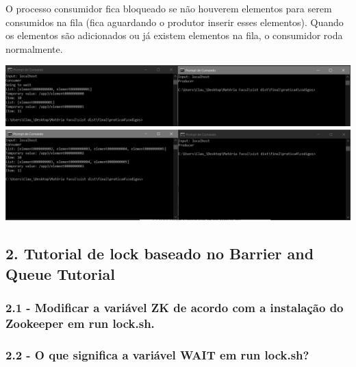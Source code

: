 O processo consumidor fica bloqueado se não houverem elementos para serem consumidos na fila (fica aguardando o produtor inserir esses elementos). Quando os elementos são adicionados ou já existem elementos na fila, o consumidor roda normalmente.
\newline

\begin{center}
\includegraphics[width=20cm]{pratica4/prints/roteiro 1.7 c-p.PNG}
\includegraphics[width=20cm]{pratica4/prints/roteiro 1.7 p-p-c.PNG}
\end{center}

\subsection*{2. Tutorial de lock baseado no Barrier and Queue Tutorial}

\subsubsection{2.1 - Modificar a variável ZK de acordo com a instalação do Zookeeper em run lock.sh.}

\vspace{-0.5em}
\begin{minipage}{\textwidth}
  \hspace{-1em}
  \centering
  
  \label{prog1}
  \hspace{1em}
\end{minipage}
\vspace{0.5em}

\subsubsection{2.2 - O que significa a variável WAIT em run lock.sh?}

